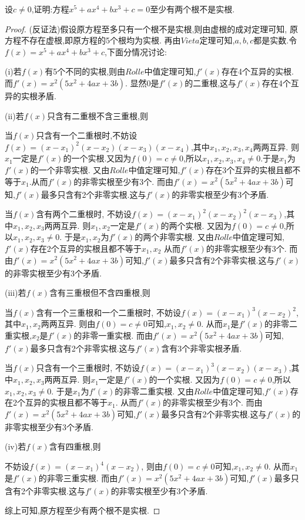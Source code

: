 \documentclass[lang=cn,newtx,10pt,scheme=chinese]{elegantbook}
\begin{document}
\begin{exercise}
    设\(c\neq0\),证明:方程\(x^5 + ax^4 + bx^3 + c = 0\)至少有两个根不是实根.
\end{exercise}
    \begin{proof}
        (反证法)假设原方程至多只有一个根不是实根,则由虚根的成对定理可知,
        原方程不存在虚根,即原方程的5个根均为实根.
        再由$Vieta$定理可知,$a,b,c$都是实数.令$f(x)=x^5+ax^4+bx^3+c$,下面分情况讨论:

        (i)若$f(x)$有5个不同的实根,则由$Rolle$中值定理可知,$f'(x)$存在4个互异的实根.
        而$f'(x) =x^2(5x^2+4ax+3b)$.
        显然0是$f'(x)$的二重根,这与$f'(x)$存在4个互异的实根矛盾.

        (ii)若$f(x)$只含有二重根不含三重根,则

        当$f(x)$只含有一个二重根时,不妨设$f(x)=(x-x_1)^2(x-x_2)(x-x_3)(x-x_4)$,其中$x_1,x_2,x_3,x_4$两两互异.
        则$x_1$一定是$f'(x)$的一个实根.又因为$f(0)=c\ne0$,所以$x_1,x_2,x_3,x_4\ne0$.于是$x_1$为$f'(x)$的一个非零实根.
        又由$Rolle$中值定理可知,$f'(x)$存在3个互异的实根且都不等于$x_1$.从而$f'(x)$的非零实根至少有3个.
        而由$f'(x) =x^2(5x^2+4ax+3b)$可知,$f'(x)$最多只含有2个非零实根.这与$f'(x)$的非零实根至少有3个矛盾.

        当$f(x)$含有两个二重根时,
        不妨设$f(x)=(x-x_1)^2(x-x_2)^2(x-x_3)$,其中$x_1,x_2,x_3$两两互异.
        则$x_1,x_2$一定是$f'(x)$的两个实根.
        又因为$f(0)=c\ne0$,所以$x_1,x_2,x_3\ne0$.
        于是$x_1,x_2$为$f'(x)$的两个非零实根.
        又由$Rolle$中值定理可知,$f'(x)$存在2个互异的实根且都不等于$x_1,x_2$
        从而$f'(x)$的非零实根至少有3个.
        而由$f'(x) =x^2(5x^2+4ax+3b)$可知,$f'(x)$最多只含有2个非零实根.这与$f'(x)$的非零实根至少有3个矛盾.

        (iii)若$f(x)$含有三重根但不含四重根,则

        当$f(x)$含有一个三重根和一个二重根时,
        不妨设$f(x)=(x-x_1)^3(x-x_2)^2$,其中$x_1,x_2$两两互异.
        则由$f(0)=c\ne0$可知,$x_1,x_2\ne0$.
        从而$x_1$是$f'(x)$的非零二重实根,$x_2$是$f'(x)$的非零一重实根.
        而由$f'(x) =x^2(5x^2+4ax+3b)$可知,$f'(x)$最多只含有2个非零实根.这与$f'(x)$含有3个非零实根矛盾.
        
        当$f(x)$只含有一个三重根时,
        不妨设$f(x)=(x-x_1)^3(x-x_2)(x-x_3)$,其中$x_1,x_2,x_3$两两互异.
        则$x_1$一定是$f'(x)$的一个实根.
        又因为$f(0)=c\ne0$,所以$x_1,x_2,x_3\ne0$.
        于是$x_1$为$f'(x)$的非零二重实根.
        又由$Rolle$中值定理可知,$f'(x)$存在2个互异的实根且都不等于$x_1$.
        从而$f'(x)$的非零实根至少有3个.
        而由$f'(x) =x^2(5x^2+4ax+3b)$可知,$f'(x)$最多只含有2个非零实根.这与$f'(x)$的非零实根至少有3个矛盾.

        (iv)若$f(x)$含有四重根,则

        不妨设$f(x)=(x-x_1)^4(x-x_2)$,
        则由$f(0)=c\ne0$可知,$x_1,x_2\ne0$.
        从而$x_1$是$f'(x)$的非零三重实根.
        而由$f'(x) =x^2(5x^2+4ax+3b)$可知,$f'(x)$最多只含有2个非零实根.这与$f'(x)$的非零实根至少有3个矛盾.

        综上可知,原方程至少有两个根不是实根.
    \end{proof}
\end{document}
